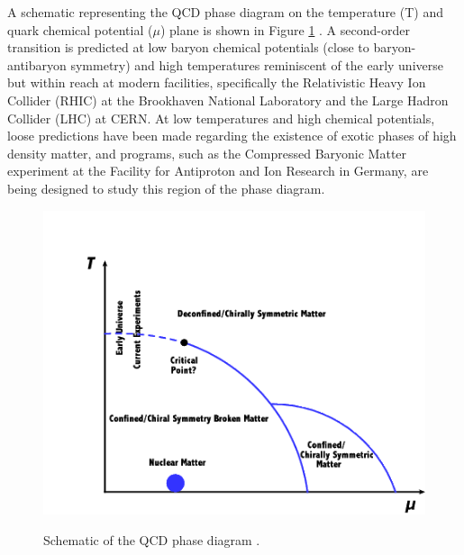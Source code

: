 A schematic representing the QCD phase diagram on the temperature (T) and quark chemical potential ($\mu$) plane is shown in Figure \ref{fig:PhaseDiagram} \cite{1742-6596-761-1-012066}. A second-order transition is predicted at low baryon chemical potentials (close to baryon-antibaryon symmetry) and high temperatures reminiscent of the early universe but within reach at modern facilities, specifically the Relativistic Heavy Ion Collider (RHIC) at the Brookhaven National Laboratory and the Large Hadron Collider (LHC) at CERN. At low temperatures and high chemical potentials, loose predictions have been made regarding the existence of exotic phases of high density matter, and programs, such as the Compressed Baryonic Matter experiment at the Facility for Antiproton and Ion Research in Germany, are being designed to study this region of the phase diagram.

\begin{figure}[h]
  \centering
  \includegraphics[width=5.5in]{figures/1742-6596-761-1-012066.png}\\
  \caption{Schematic of the QCD phase diagram \cite{1742-6596-761-1-012066}.}\label{fig:PhaseDiagram}
\end{figure}


